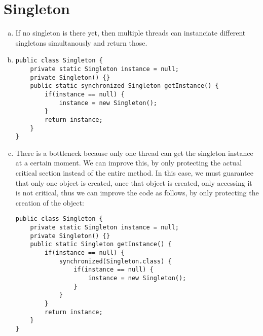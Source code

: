 \documentclass{report}
\begin{document}
	\section{Singleton}
	\startsection
		\begin{enumerate}[a)]
			\item If no singleton is there yet, then multiple threads can instanciate different singletons simultanously and return those.
			\item
			\begin{verbatim}
public class Singleton {
	private static Singleton instance = null;
	private Singleton() {}
	public static synchronized Singleton getInstance() {
		if(instance == null) {
			instance = new Singleton();
		}
		return instance;
	}
}
			\end{verbatim}
			\item There is a bottleneck because only one thread can get the singleton instance at a certain moment. We can improve this, by only protecting the actual critical section instead of the entire method. In this case, we must guarantee that only one object is created, once that object is created, only accessing it is not critical, thus we can improve the code as follows, by only protecting the creation of the object:
			\begin{verbatim}
public class Singleton {
	private static Singleton instance = null;
	private Singleton() {}
	public static Singleton getInstance() {
		if(instance == null) {
			synchronized(Singleton.class) {
				if(instance == null) {
					instance = new Singleton();
				}
			}
		}
		return instance;
	}
}
			\end{verbatim}
		\end{enumerate}
	\closesection
	
\end{document}
